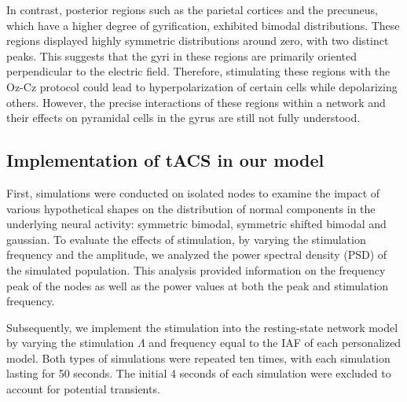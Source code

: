\documentclass[../main.tex]{subfiles}
\begin{document}
In contrast, posterior regions such as the parietal cortices and the precuneus, which have a higher degree of gyrification, exhibited bimodal distributions.
These regions displayed highly symmetric distributions around zero, with two distinct peaks.
This suggests that the gyri in these regions are primarily oriented perpendicular to the electric field.
Therefore, stimulating these regions with the Oz-Cz protocol could lead to hyperpolarization of certain cells while depolarizing others.
However, the precise interactions of these regions within a network and their effects on pyramidal cells in the gyrus are still not fully understood.

\subsection{Implementation of tACS in our model}
First, simulations were conducted on isolated nodes to examine the impact of various hypothetical shapes on the distribution of normal components in the underlying neural activity: symmetric bimodal, symmetric shifted bimodal and gaussian.
To evaluate the effects of stimulation, by varying the stimulation frequency and the amplitude, we analyzed the power spectral density (PSD) of the simulated population. 
This analysis provided information on the frequency peak of the nodes as well as the power values at both the peak and stimulation frequency.

Subsequently, we implement the stimulation into the resting-state network model by varying the stimulation  $\Lambda$ and frequency equal to the IAF of each personalized model.
Both types of simulations were repeated ten times, with each simulation lasting for 50 seconds.
The initial 4 seconds of each simulation were excluded to account for potential transients.

\end{document}
